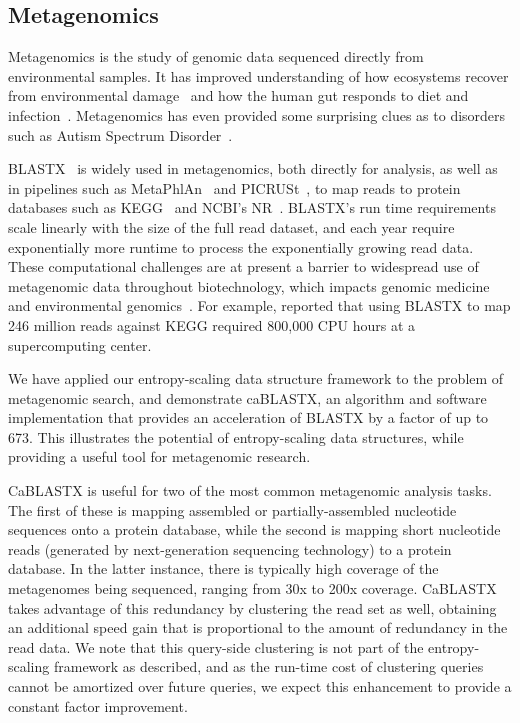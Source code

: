 \documentclass[review,preprint,12pt]{elsarticle}
\renewcommand{\cite}{\citep} %
\theoremstyle{definition}
\theoremstyle{remark}
\numberwithin{equation}{section}
\begin{document}
\subsection{Metagenomics}

Metagenomics is the study of genomic data sequenced directly from environmental
samples.
It has improved understanding of how ecosystems recover
from environmental damage~\cite{tyson2004community} and how the human gut responds 
to diet
and infection~\cite{david2014host}.
Metagenomics has even provided some surprising clues as to disorders 
such as Autism Spectrum Disorder~\cite{macfabe2012short}.

BLASTX~\cite{altschul1990basic} is widely used in metagenomics, both directly for analysis, as 
well as in  pipelines such as MetaPhlAn~\cite{segata2012metagenomic} and
PICRUSt~\cite{langille2013predictive}, to map
reads to protein databases such as KEGG~\cite{kanehisa2000kegg} and NCBI's 
NR~\cite{sayers2011database}.
BLASTX's run time requirements scale linearly with the size of the 
full read dataset, and each year require exponentially more runtime to process 
the exponentially growing read data. 
These computational challenges are at present a barrier to widespread use of 
metagenomic data throughout biotechnology, which impacts genomic medicine and 
environmental genomics~\cite{frank2008gastrointestinal}.
For example, \citet{mackelprang2011metagenomic} reported that using BLASTX to map 246
million reads against KEGG required 800,000 CPU hours at a supercomputing 
center.

We have applied our entropy-scaling data structure framework to the problem of 
metagenomic search, and demonstrate caBLASTX, an algorithm and software 
implementation that provides an acceleration of BLASTX by a factor of up 
to 673.
This illustrates the potential of entropy-scaling data structures, while
providing a useful tool for metagenomic research.

CaBLASTX is useful for two of the most common metagenomic analysis tasks. 
The first of these is mapping assembled or partially-assembled
nucleotide sequences onto a protein database,
while the second is mapping short nucleotide reads (generated by next-generation
sequencing technology) to a protein database.
In the latter instance, there is typically high coverage of the metagenomes
being sequenced, ranging from 30x to 200x coverage.
CaBLASTX takes advantage of this redundancy
by clustering the read set as well, obtaining an additional speed gain that is
proportional to the amount of redundancy in the read data.
We note that this query-side clustering is not part of the entropy-scaling
framework as described, and as the run-time cost of clustering queries cannot
be amortized over future queries, we expect this enhancement to provide a 
constant factor improvement.
\end{document}
